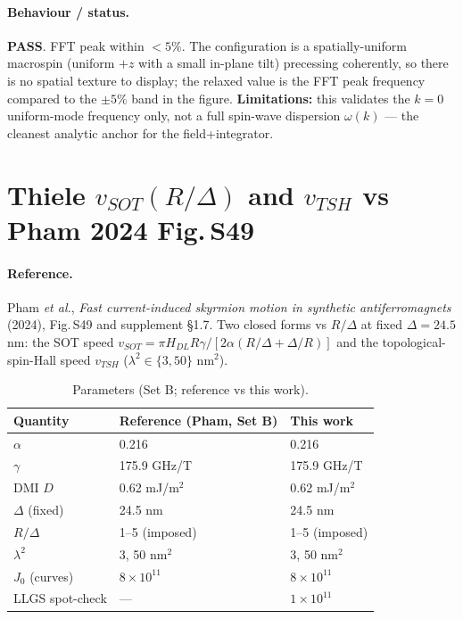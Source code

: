 \documentclass[11pt]{article}
\newcommand{\PASS}{\textcolor{green!55!black}{\textbf{PASS}}}
\begin{document}
\paragraph{Behaviour / status.} \PASS. FFT peak within $<5\%$.
The configuration is a spatially-uniform macrospin (uniform $+z$
with a small in-plane tilt) precessing coherently, so there is no
spatial texture to display; the relaxed value is the FFT peak
frequency compared to the $\pm5\%$ band in the figure.
\textbf{Limitations:} this validates the $k{=}0$ uniform-mode
frequency only, not a full spin-wave dispersion $\omega(k)$ --- the
cleanest analytic anchor for the field+integrator.

\clearpage
\section{Thiele $v_{SOT}(R/\Delta)$ and $v_{TSH}$ vs Pham 2024
Fig.\,S49}
\label{sec:thiele}

\paragraph{Reference.} Pham \emph{et al.}, \emph{Fast
current-induced skyrmion motion in synthetic antiferromagnets}
(2024), Fig.\,S49 and supplement \S1.7. Two closed forms vs
$R/\Delta$ at fixed $\Delta=24.5$ nm: the SOT speed
$v_{SOT}=\pi H_{DL} R\gamma/[2\alpha(R/\Delta+\Delta/R)]$ and the
topological-spin-Hall speed $v_{TSH}$ ($\lambda^2\in\{3,50\}$
nm$^2$).

\begin{table}[htbp]
\centering
\caption{Parameters (Set B; reference vs this work).}
\begin{tabular}{@{}lll@{}}
\toprule
Quantity & Reference (Pham, Set B) & This work \\
\midrule
$\alpha$        & 0.216             & 0.216 \\
$\gamma$        & 175.9 GHz/T       & 175.9 GHz/T \\
DMI $D$         & 0.62 mJ/m$^2$     & 0.62 mJ/m$^2$ \\
$\Delta$ (fixed)& 24.5 nm           & 24.5 nm \\
$R/\Delta$      & 1--5 (imposed)    & 1--5 (imposed) \\
$\lambda^2$     & 3, 50 nm$^2$      & 3, 50 nm$^2$ \\
$J_0$ (curves)  & $8\times10^{11}$  & $8\times10^{11}$ \\
LLGS spot-check & ---               & $1\times10^{11}$ \\
\bottomrule
\end{tabular}
\end{table}
\end{document}

